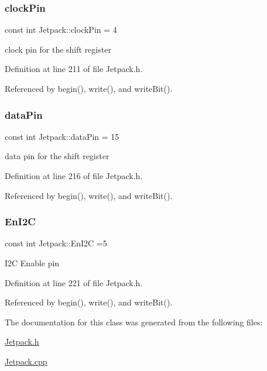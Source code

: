 \subsubsection{\texorpdfstring{clock\+Pin}{clockPin}}
{\footnotesize\ttfamily const int Jetpack\+::clock\+Pin = 4\hspace{0.3cm}{\ttfamily [private]}}

clock pin for the shift register 

Definition at line 211 of file Jetpack.\+h.



Referenced by begin(), write(), and write\+Bit().

\mbox{\label{class_jetpack_a3d669a56e93c71dd25f970d4ed7d0c00}} 
\subsubsection{\texorpdfstring{data\+Pin}{dataPin}}
{\footnotesize\ttfamily const int Jetpack\+::data\+Pin = 15\hspace{0.3cm}{\ttfamily [private]}}

data pin for the shift register 

Definition at line 216 of file Jetpack.\+h.



Referenced by begin(), write(), and write\+Bit().

\mbox{\label{class_jetpack_a81df984fb4cea98c71aa1a1cfcdfe814}} 
\subsubsection{\texorpdfstring{En\+I2C}{EnI2C}}
{\footnotesize\ttfamily const int Jetpack\+::\+En\+I2C =5\hspace{0.3cm}{\ttfamily [private]}}

I2C Enable pin 

Definition at line 221 of file Jetpack.\+h.



Referenced by begin(), write(), and write\+Bit().



The documentation for this class was generated from the following files\+:\begin{DoxyCompactItemize}
\item 
\hyperlink{_jetpack_8h}{Jetpack.\+h}\item 
\hyperlink{_jetpack_8cpp}{Jetpack.\+cpp}\end{DoxyCompactItemize}
